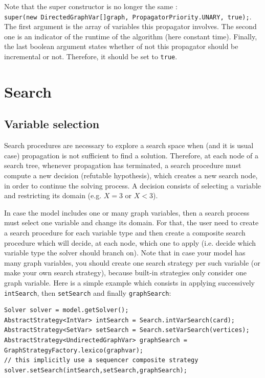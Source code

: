 \documentclass{article}
\begin{document}
Note that the super constructor is no longer the same : \\
\texttt{super(new DirectedGraphVar[]{graph}, PropagatorPriority.UNARY, true);}. 
The first argument is the array of variables this propagator involves. The second one is an indicator of the runtime of the algorithm (here constant time). Finally, the last boolean argument states whether of not this propagator should be incremental or not. Therefore, it should be set to \texttt{true}.

\newpage{}
\section{Search}

\subsection{Variable selection}

Search procedures are necessary to explore a search space when (and it is usual case) propagation is not sufficient to find a solution. 
Therefore, at each node of a search tree, whenever propagation has terminated, a search procedure must compute a new decision (refutable hypothesis), which creates a new search node, in order to continue the solving process. A decision consists of selecting a variable and restricting its domain (e.g. $X=3$ or $X<3$). 

In case the model includes one or many graph variables, then a search process must select one variable and change its domain. 
For that, the user need to create a search procedure for each variable type and then create a composite search procedure which will decide, at each node, which one to apply (i.e. decide which variable type the solver should branch on). Note that in case your model has many graph variables, you should create one search strategy per such variable (or make your own search strategy), because built-in strategies only consider one graph variable. Here is a simple example which consists in applying successively \texttt{intSearch}, then \texttt{setSearch} and finally \texttt{graphSearch}:

\begin{lstlisting}
Solver solver = model.getSolver();
AbstractStrategy<IntVar> intSearch = Search.intVarSearch(card);
AbstractStrategy<SetVar> setSearch = Search.setVarSearch(vertices);
AbstractStrategy<UndirectedGraphVar> graphSearch = GraphStrategyFactory.lexico(graphvar);
// this implicitly use a sequencer composite strategy
solver.setSearch(intSearch,setSearch,graphSearch); 
\end{lstlisting}
\end{document}
